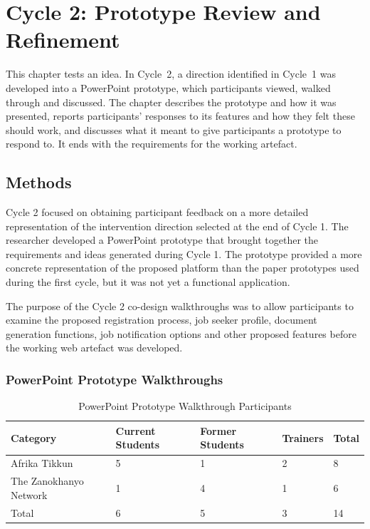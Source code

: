 \chapter{Cycle 2: Prototype Review and Refinement}

\begin{chapterintro}
This chapter tests an idea. In Cycle~2, a direction identified in Cycle~1 was developed into a PowerPoint prototype, which participants viewed, walked through and discussed. The chapter describes the prototype and how it was presented, reports participants' responses to its features and how they felt these should work, and discusses what it meant to give participants a prototype to respond to. It ends with the requirements for the working artefact.
\end{chapterintro}


\section{Methods}

Cycle 2 focused on obtaining participant feedback on a more detailed representation of the intervention direction selected at the end of Cycle 1. The researcher developed a PowerPoint prototype that brought together the requirements and ideas generated during Cycle 1. The prototype provided a more concrete representation of the proposed platform than the paper prototypes used during the first cycle, but it was not yet a functional application.

The purpose of the Cycle 2 co-design walkthroughs was to allow participants to examine the proposed registration process, job seeker profile, document generation functions, job notification options and other proposed features before the working web artefact was developed.


\subsection{PowerPoint Prototype Walkthroughs}

\begin{table}[H]
\centering
\caption{PowerPoint Prototype Walkthrough Participants}
\label{tab:powerpoint_participants}
\renewcommand{\arraystretch}{1.2}
\begin{tabularx}{\textwidth}{|X|p{2.5cm}|p{2.5cm}|p{2.2cm}|p{1.8cm}|}
\hline
\rowcolor{gray!30}
Category & Current Students & Former Students & Trainers & Total \\
\hline
Afrika Tikkun & 5 & 1 & 2 & 8 \\
\hline
The Zanokhanyo Network & 1 & 4 & 1 & 6 \\
\hline
\rowcolor{gray!15}
Total & 6 & 5 & 3 & 14 \\
\hline
\end{tabularx}
\end{table}

